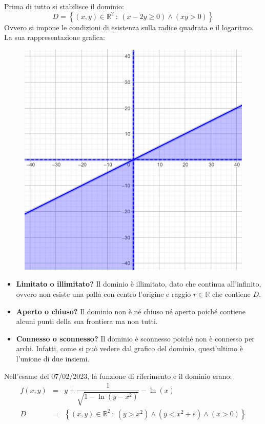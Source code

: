 \documentclass[a4paper]{article}
\begin{document}
	\noindent
	Prima di tutto si stabilisce il dominio:
	\begin{equation*}
		D = \left\{\left(x,y\right) \in \mathbb{R}^{2} \: : \: \left(x-2y \ge 0\right) \land \left(xy > 0\right)\right\}
	\end{equation*}
	Ovvero si impone le condizioni di esistenza sulla radice quadrata e il logaritmo. La sua rappresentazione grafica:
	\begin{figure}[!htp]
		\centering
		\includegraphics[width=.8\textwidth]{img/grafico-ex3-4.png}
	\end{figure}
	\begin{itemize}
		\item \textbf{Limitato o illimitato?} Il dominio è illimitato, dato che continua all'infinito, ovvero non esiste una palla con centro l'origine e raggio $r \in \mathbb{R}$ che contiene $D$.
		
		\item \textbf{Aperto o chiuso?} Il dominio non è né chiuso né aperto poiché contiene alcuni punti della sua frontiera ma non tutti.
		
		\item \textbf{Connesso o sconnesso?} Il dominio è sconnesso poiché non è connesso per archi. Infatti, come si può vedere dal grafico del dominio, quest'ultimo è l'unione di due insiemi.
	\end{itemize}
	Nell'esame del 07/02/2023, la funzione di riferimento e il dominio erano:
	\begin{equation*}
		\begin{array}{rcl}
			f\left(x,y\right) &=& y + \dfrac{1}{\sqrt{1 - \ln\left(y-x^{2}\right)}} - \ln\left(x\right) \\ [1.5em]
			D &=& \left\{\left(x,y\right) \in \mathbb{R}^{2} \: : \: \left(y > x^{2}\right) \land \left(y < x^{2} + e\right) \land \left(x > 0\right)\right\}
		\end{array}
	\end{equation*}
\end{document}
